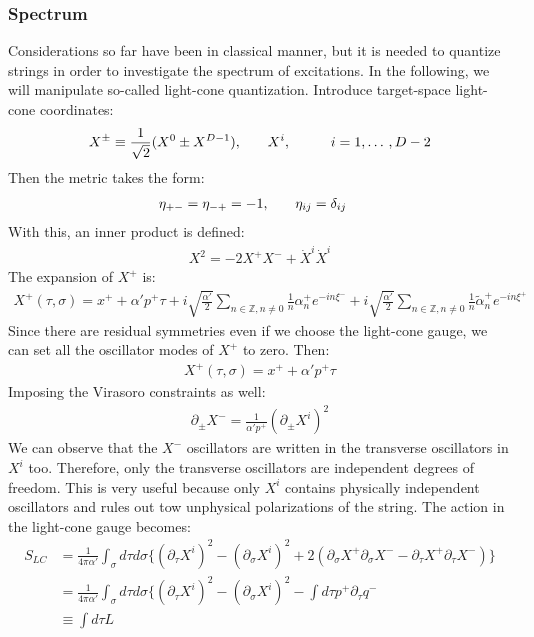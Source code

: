 \subsubsection{Spectrum}
Considerations so far have been in classical manner, but it is needed to quantize strings in order to investigate the spectrum of excitations. In the following, we will manipulate so-called light-cone quantization. Introduce target-space light-cone coordinates:
\begin{align}
    X^{\pm} \equiv \frac{1}{\sqrt{2}} (X^{0} \pm X^{D-1}), & \qq{} X^{i}, & \qq{} i = 1,\dotso ,D-2
\end{align} 
Then the metric takes the form:
\begin{align}
     \eta _{+-} = \eta _{-+} = -1, & \qq{} \eta _{ij} = \delta _{ij}
\end{align}
With this, an inner product is defined:
\begin{align}
    X^{2} = -2X^{+}X^{-} + \dot {X}^{i} \dot {X}^{i}
\end{align}
The expansion of $X^{+}$ is:
\begin{align}
    X^{+} (\tau,\sigma) = x^{+} + \alpha' p^{+} \tau + i\sqrt{\frac{\alpha'}{2}} \sum _{n\in \mathbb{Z},n\neq 0} \frac{1}{n} \alpha _{n} ^{+} e^{-in\xi ^{-}} +i\sqrt{\frac{\alpha'}{2}} \sum _{n\in \mathbb{Z},n\neq 0} \frac{1}{n} \tilde{\alpha} _{n} ^{+} e^{-in\xi ^{+}}
\end{align}
Since there are residual symmetries even if we choose the light-cone gauge, we can set all the oscillator modes of $X^{+}$ to zero. Then:
\begin{align}
    X^{+} (\tau,\sigma) = x^{+} + \alpha'p^{+}\tau
\end{align}
Imposing the Virasoro constraints as well:
\begin{align}
    \partial _{\pm} X^{-} = \frac{1}{\alpha' p^{+}} (\partial _{\pm} X^{i})^{2}
\end{align}
We can observe that the $X^{-}$ oscillators are written in the transverse oscillators in $X^{i}$ too. Therefore, only the transverse oscillators are independent degrees of freedom. This is very useful because only $X^{i}$ contains physically independent oscillators and rules out tow unphysical polarizations of the string. The action in the light-cone gauge becomes:
\begin{align}
    S_{LC} &= \frac{1}{4\pi \alpha'} \int _{\sigma} d\tau d\sigma \lbrace (\partial _{\tau} X^{i})^{2} - (\partial _{\sigma} X^{i})^{2} + 2(\partial _{\sigma} X^{+} \partial _{\sigma} X^{-} - \partial _{\tau} X^{+} \partial _{\tau} X^{-}) \rbrace \nonumber \\
    &= \frac{1}{4\pi\alpha'} \int _{\sigma} d\tau d\sigma \lbrace (\partial _{\tau} X^{i})^{2} - (\partial _{\sigma} X^{i})^{2} - \int d\tau p^{+} \partial _{\tau} q^{-} \nonumber \\
    & \equiv \int d\tau L 
\end{align}
